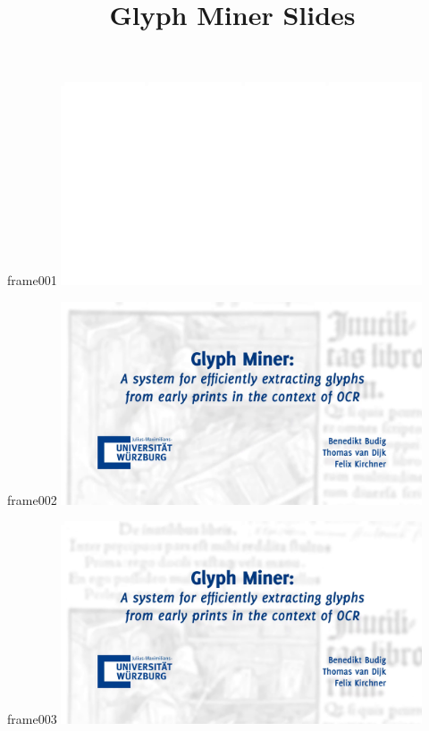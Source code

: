 \documentclass{beamer}
\title{Glyph Miner Slides}
\author{}
\date{}
\begin{document}
\frame{\titlepage}

\begin{frame}{frame001}
\includegraphics[width=0.8\textwidth]{output/exported-frames/frame001.png}
\note{}
\end{frame}

\begin{frame}{frame002}
\includegraphics[width=0.8\textwidth]{output/exported-frames/frame002.png}
\note{}
\end{frame}

\begin{frame}{frame003}
\includegraphics[width=0.8\textwidth]{output/exported-frames/frame003.png}
\note{}
\end{frame}
\end{document}
